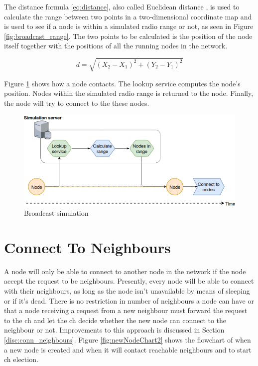 \documentclass[USenglish]{uit-thesis}
\begin{document}
The distance formula \ref{eq:distance}, also called Euclidean distance \cite{euclidean}, is used to calculate the range between two points in a two-dimensional coordinate map and is used to see if a node is within a simulated radio range or not, as seen in Figure \ref{fig:broadcast_range}. The two points to be calculated is the position of the node itself together with the positions of all the running nodes in the network.

\begin{equation} \label{eq:distance}
d = \sqrt{(X_{2} - X_{1})^{2}+(Y_{2} - Y_{1})^{2}}
\end{equation}


Figure \ref{fig:broadcast_simulation} shows how a node contacts. The lookup service computes the node's position. Nodes within the simulated radio range is returned to the node. Finally, the node will try to connect to the these nodes.

\begin{figure} %
\centering
\includegraphics[width=\textwidth]{broadcast_simulation_kopi.png}
\caption{Broadcast simulation}
\label{fig:broadcast_simulation}
\end{figure}

\section{Connect To Neighbours}
A node will only be able to connect to another node in the network if the node accept the request to be neighbours. Presently, every node will be able to connect with their neighbours, as long as the node isn't unavailable by means of sleeping or if it's dead. There is no restriction in number of neighbours a node can have or that a node receiving a request from a new neighbour must forward the request to the \gls{ch} and let the \gls{ch} decide whether the new node can connect to the neighbour or not. Improvements to this approach is discussed in Section \ref{disc:conn_neighbours}. Figure \ref{fig:newNodeChart2} shows the flowchart of when a new node is created and when it will contact reachable neighbours and to start \gls{ch} election.
\end{document}
